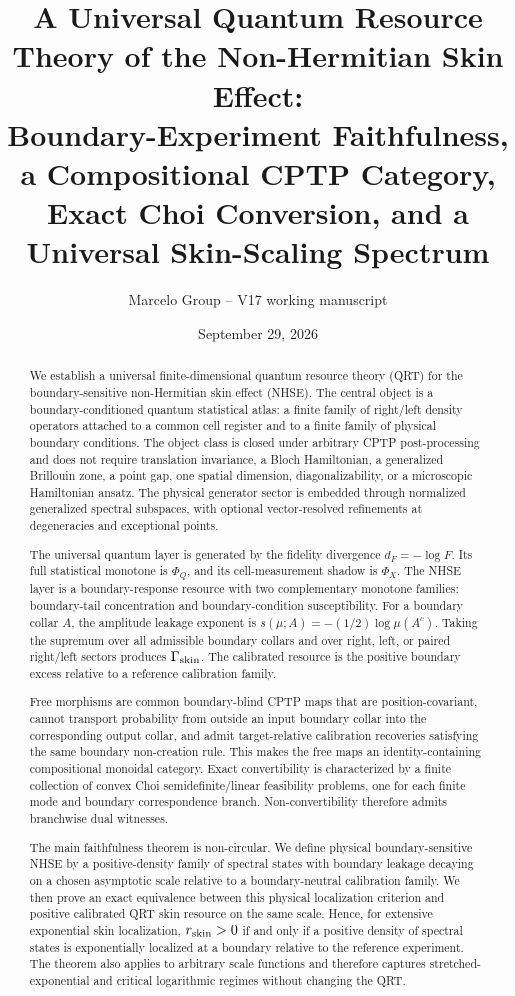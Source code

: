 \documentclass[11pt]{article}
\title{A Universal Quantum Resource Theory of the Non-Hermitian Skin Effect:\\
Boundary-Experiment Faithfulness, a Compositional CPTP Category, Exact Choi Conversion, and a Universal Skin-Scaling Spectrum}
\author{Marcelo Group -- V17 working manuscript}
\date{September 29, 2026}
\begin{document}
\setlength{\emergencystretch}{2em}
\maketitle

\begin{abstract}
We establish a universal finite-dimensional quantum resource theory (QRT) for the boundary-sensitive non-Hermitian skin effect (NHSE). The central object is a boundary-conditioned quantum statistical atlas: a finite family of right/left density operators attached to a common cell register and to a finite family of physical boundary conditions. The object class is closed under arbitrary CPTP post-processing and does not require translation invariance, a Bloch Hamiltonian, a generalized Brillouin zone, a point gap, one spatial dimension, diagonalizability, or a microscopic Hamiltonian ansatz. The physical generator sector is embedded through normalized generalized spectral subspaces, with optional vector-resolved refinements at degeneracies and exceptional points.

The universal quantum layer is generated by the fidelity divergence $d_F=-\log F$. Its full statistical monotone is $\Phi_Q$, and its cell-measurement shadow is $\Phi_X$. The NHSE layer is a boundary-response resource with two complementary monotone families: boundary-tail concentration and boundary-condition susceptibility. For a boundary collar $A$, the amplitude leakage exponent is $s(\mu;A)=-(1/2)\log\mu(A^c)$. Taking the supremum over all admissible boundary collars and over right, left, or paired right/left sectors produces $\Gamma_{\rm skin}$. The calibrated resource is the positive boundary excess relative to a reference calibration family.

Free morphisms are common boundary-blind CPTP maps that are position-covariant, cannot transport probability from outside an input boundary collar into the corresponding output collar, and admit target-relative calibration recoveries satisfying the same boundary non-creation rule. This makes the free maps an identity-containing compositional monoidal category. Exact convertibility is characterized by a finite collection of convex Choi semidefinite/linear feasibility problems, one for each finite mode and boundary correspondence branch. Non-convertibility therefore admits branchwise dual witnesses.

The main faithfulness theorem is non-circular. We define physical boundary-sensitive NHSE by a positive-density family of spectral states with boundary leakage decaying on a chosen asymptotic scale relative to a boundary-neutral calibration family. We then prove an exact equivalence between this physical localization criterion and positive calibrated QRT skin resource on the same scale. Hence, for extensive exponential skin localization, $r_{\rm skin}>0$ if and only if a positive density of spectral states is exponentially localized at a boundary relative to the reference experiment. The theorem also applies to arbitrary scale functions and therefore captures stretched-exponential and critical logarithmic regimes without changing the QRT.


\end{abstract}
\end{document}
